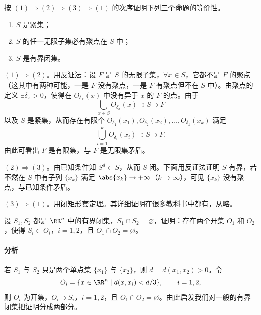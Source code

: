 \begin{xexample}[17.2.3]
按 $(1)\Rightarrow(2)\Rightarrow(3)\Rightarrow(1)$ 的次序证明下列三个命题的等价性。
\begin{enumerate}[label=(\arabic*)]
  \item $S$ 是紧集；
  \item $S$ 的任一无限子集必有聚点在 $S$ 中；
  \item $S$ 是有界闭集。
\end{enumerate}
\end{xexample}
\begin{xproof}
$(1)\Rightarrow(2)$。用反证法：设 $F$ 是 $S$ 的无限子集，$\forall x\in S$，它都不是 $F$ 的聚点（这其中有两种可能，一是 $F$ 没有聚点，一是 $F$ 有聚点但不在 $S$ 中）。由聚点的定义 $\exists\delta_x>0$，使得在 $O_{\delta_x}(x)$ 中没有异于 $x$ 的 $F$ 的点。由于
\[
  \bigcup_{x\in S}O_{\delta_x}(x)\supset S\supset F
\]
以及 $S$ 是紧集，从而存在有限个 $O_{\delta_1}(x_1),O_{\delta_2}(x_2),\ldots,O_{\delta_k}(x_k)$ 满足
\[
  \bigcup_{i=1}^kO_{\delta_i}(x_i)\supset S\supset F.
\]
由此可看出 $F$ 是有限集，与 $F$ 是无限集矛盾。

$(2)\Rightarrow(3)$。由已知条件知 $S^d\subset S$，从而 $S$ 闭。下面用反证法证明 $S$ 有界，若不然在 $S$ 中有子列 $\{x_k\}$ 满足 $\abs{x_k}\to+\infty$（$k\to\infty$），可见 $\{x_k\}$ 没有聚点，与已知条件矛盾。

$(3)\Rightarrow(1)$。用闭矩形套定理。其详细证明在很多教科书中都有，从略。
\end{xproof}

\begin{xexample}[17.2.4]
设 $S_1,S_2$ 都是 $\RR^n$ 中的有界闭集，$S_1\cap S_2=\varnothing$，证明：存在两个开集 $O_1$ 和 $O_2$，使得 $S_i\subset O_i$，$i=1,2$，且 $O_1\cap O_2=\varnothing$。
\end{xexample}

\paragraph{分析}
若 $S_1$ 与 $S_2$ 只是两个单点集 $\{x_1\}$ 与 $\{x_2\}$，则 $d=d(x_1,x_2)>0$。令
\[
  O_i=\{x\in\RR^n\mid d(x,x_i)<d/3\},\qquad i=1,2,
\]
则 $O_i$ 为开集，$O_i\supset S_i$，$i=1,2$，且 $O_1\cap O_2=\varnothing$。由此启发我们对一般的有界闭集把证明分成两部分。

